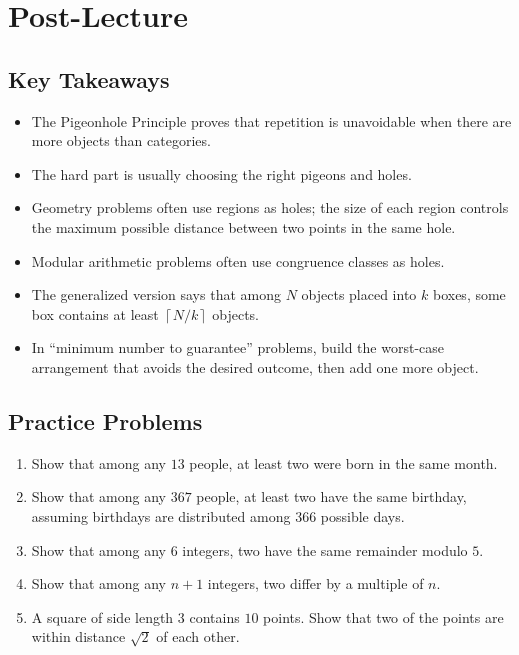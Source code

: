 \documentclass{article}
\begin{document}
\section*{Post-Lecture}

\subsection*{Key Takeaways}

\begin{itemize}
    \item The Pigeonhole Principle proves that repetition is unavoidable when there are more objects than categories.
    \item The hard part is usually choosing the right pigeons and holes.
    \item Geometry problems often use regions as holes; the size of each region controls the maximum possible distance between two points in the same hole.
    \item Modular arithmetic problems often use congruence classes as holes.
    \item The generalized version says that among $N$ objects placed into $k$ boxes, some box contains at least $\left\lceil N/k\right\rceil$ objects.
    \item In ``minimum number to guarantee'' problems, build the worst-case arrangement that avoids the desired outcome, then add one more object.
\end{itemize}

\subsection*{Practice Problems}

\begin{enumerate}
    \item Show that among any $13$ people, at least two were born in the same month.
    \item Show that among any $367$ people, at least two have the same birthday, assuming birthdays are distributed among $366$ possible days.
    \item Show that among any $6$ integers, two have the same remainder modulo $5$.
    \item Show that among any $n+1$ integers, two differ by a multiple of $n$.
    \item A square of side length $3$ contains $10$ points. Show that two of the points are within distance $\sqrt{2}$ of each other.
\end{enumerate}
\end{document}
